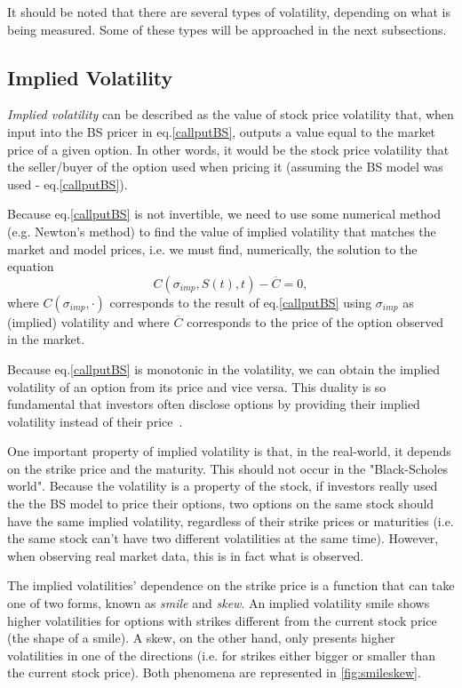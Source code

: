It should be noted that there are several types of volatility, depending on what is being measured. Some of these types will be approached in the next subsections.

\subsection{Implied Volatility}
\label{section:impliedvolatility}
\emph{Implied volatility} can be described as the value of stock price volatility that, when input into the BS pricer in eq.\eqref{callputBS}, outputs a value equal to the market price of a given option.
In other words, it would be the stock price volatility that the seller/buyer of the option used when pricing it (assuming the BS model was used - eq.\eqref{callputBS}).

Because eq.\eqref{callputBS} is not invertible, we need to use some numerical method (e.g. Newton's method) to find the value of implied volatility that matches the market and model prices, i.e. we must find, numerically, the solution to the equation
\begin{equation}\label{impvolform}
C(\sigma_{imp},S(t),t)-\overline{C}=0,
\end{equation}
\noindent where $C(\sigma_{imp},\cdot)$ corresponds to the result of eq.\eqref{callputBS} using $\sigma_{imp}$ as (implied) volatility and where $\overline{C}$ corresponds to the price of the option observed in the market.

Because eq.\eqref{callputBS} is monotonic in the volatility, we can obtain the implied volatility of an option from its price and vice versa. This duality is so fundamental that investors often disclose options by providing their implied volatility instead of their price~\cite{Wilmott}.

One important property of implied volatility is that, in the real-world, it depends on the strike price and the maturity. This should not occur in the "Black-Scholes world". Because the volatility is a property of the stock, if investors really used the the BS model to price their options, two options on the same stock should have the same implied volatility, regardless of their strike prices or maturities (i.e. the same stock can't have two different volatilities at the same time).
However, when observing real market data, this is in fact what is observed.

The implied volatilities' dependence on the strike price is a function that can take one of two forms, known as \emph{smile} and \emph{skew}.
An implied volatility smile shows higher volatilities for options with strikes different from the current stock price (the shape of a smile). A skew, on the other hand, only presents higher volatilities in one of the directions (i.e. for strikes either bigger or smaller than the current stock price). Both phenomena are represented in \autoref{fig:smileskew}.

